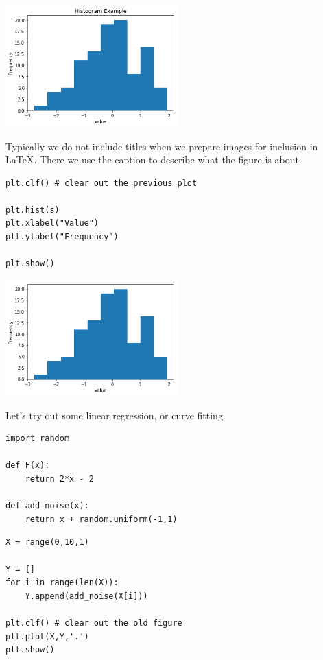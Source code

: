 \begin{center}
\includegraphics[width=0.5\textwidth]{scipy/output_25_0.png}
\end{center}

Typically we do not include titles when we prepare images for inclusion
in LaTeX. There we use the caption to describe what the figure is about.

\begin{verbatim}
plt.clf() # clear out the previous plot

plt.hist(s)
plt.xlabel("Value")
plt.ylabel("Frequency")

plt.show()
\end{verbatim}

\begin{center}
\includegraphics[width=0.5\textwidth]{scipy/output_27_0.png}
\end{center}

Let's try out some linear regression, or curve fitting.

\begin{verbatim}
import random

def F(x):
    return 2*x - 2

def add_noise(x):
    return x + random.uniform(-1,1) 
\end{verbatim}

\begin{verbatim}
X = range(0,10,1)

Y = []
for i in range(len(X)):
    Y.append(add_noise(X[i]))

plt.clf() # clear out the old figure
plt.plot(X,Y,'.')
plt.show()
\end{verbatim}

